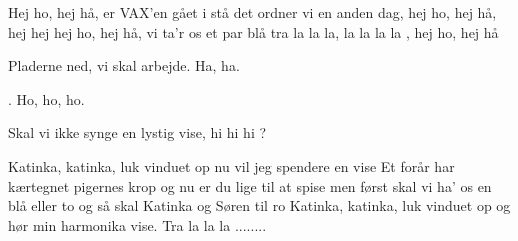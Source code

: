 \documentclass[a4paper,11pt]{article}
\begin{document}
\begin{song}
Hej ho, hej hå, er VAX'en gået i stå
det ordner vi en anden dag, hej ho, hej hå, hej hej
hej ho, hej hå, vi ta'r os et par blå
tra la la la, la la la la , hej ho, hej hå
\end{song}

\begin{sketch}

 Pladerne ned, vi skal arbejde. Ha, ha. 

 . Ho, ho, ho.

 Skal vi ikke synge en lystig vise, hi hi hi ?
\end{sketch}

\begin{song}
Katinka, katinka, luk vinduet op
nu vil jeg spendere en vise
Et forår har kærtegnet pigernes krop
og nu er du lige til at spise
men først skal vi ha' os en blå eller to
og så skal Katinka og Søren til ro
Katinka, katinka, luk vinduet op
og hør min harmonika vise.
Tra la la la ........
\end{song}
\end{document}
